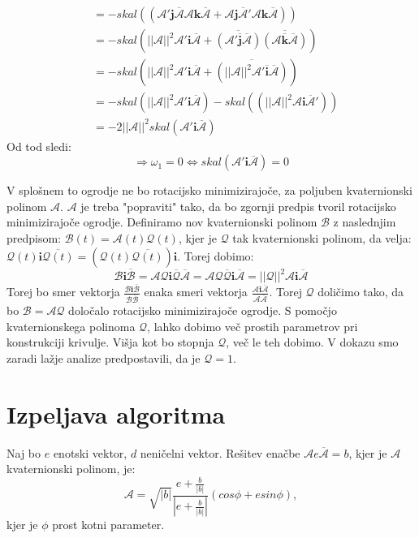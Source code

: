 \documentclass[mat1]{fmfdelo}
\newcommand{\ii}{\boldsymbol i}
\newcommand{\jj}{\boldsymbol j}
\newcommand{\kk}{\boldsymbol k}
\newcommand{\A}{\mathcal A}
\newcommand{\B}{\mathcal B}
\newcommand{\QQ}{\mathcal Q}
\begin{document}
\begin{dokaz}
\begin{equation*}
\begin{split}
	&= -skal \left( \left( \A' \jj \overline{\A} \A \kk \overline{\A}+ \A \jj \overline{\A}' \A \kk \overline{\A}  \right) \right) \\
	&= -skal \left( ||\A||^2 \A' \ii \overline{\A}+ \overline{\left(\A' \overline{\jj} \overline{\A}\right)} \overline{ \left( \A \overline{\kk} \overline{\A} \right) }\right) \\
	&= -skal \left( ||\A||^2 \A' \ii \overline{\A}+ \overline{\left( ||\A||^2 \A' \overline{\ii} \overline{\A}\right)} \right) \\
	&= -skal \left( ||\A||^2 \A' \ii \overline{\A} \right)-skal \left(\left( ||\A||^2 \A \ii \overline{\A}'\right) \right) \\
	&= -2||\A||^2 skal \left( \A' \ii \overline{\A}\right)
\end{split}
\end{equation*}
Od tod sledi:
\begin{equation*}
\Longrightarrow \omega_1 = 0 \Leftrightarrow skal \left( \A' \ii \overline{\A} \right) = 0
\end{equation*}
\end{dokaz}
\begin{opomba}
V splošnem to ogrodje ne bo rotacijsko minimizirajoče, za poljuben kvaternionski polinom $\A$. $\A$ je treba "popraviti" tako, da bo zgornji predpis tvoril rotacijsko minimizirajoče ogrodje. Definiramo nov kvaternionski polinom $\B$ z naslednjim predpisom: $\B(t) = \A(t) \QQ(t)$, kjer je $\QQ$ tak kvaternionski polinom, da velja: $\QQ(t) \ii \overline{\QQ(t)} = \left( \QQ(t) \overline{\QQ(t)} \right) \ii$. Torej dobimo:
\begin{equation*}
	\B \ii \overline{\B} = \A \QQ \ii \overline{\QQ} \overline{\A} = \A \QQ \overline{\QQ} \ii \overline{\A} = ||\QQ||^2\A\ii\overline{\A}
\end{equation*}
Torej bo smer vektorja $\frac{\B \ii \overline{\B}}{\B  \overline{\B}}$ enaka smeri vektorja $\frac{\A \ii \overline{\A}}{\A  \overline{\A}}$. Torej $\QQ$ doličimo tako, da bo $\B = \A\QQ$ določalo rotacijsko minimizirajoče ogrodje. S pomočjo kvaternionskega polinoma $\QQ$, lahko dobimo več prostih parametrov pri konstrukciji krivulje. Višja kot bo stopnja $\QQ$, več le teh dobimo. V dokazu smo zaradi lažje analize predpostavili, da je $\QQ=1$.
\end{opomba}

\section{Izpeljava algoritma}
\begin{izrek}
Naj bo $e$ enotski vektor, $d$ neničelni vektor. Rešitev enačbe $\A e \overline{\A} = b$, kjer je $\A$ kvaternionski polinom, je:
\begin{equation*}
	\A = \sqrt{|b|} \frac{e+\frac{b}{|b|}}{|e+\frac{b}{|b|}|} \left( cos \phi + e sin\phi \right),
\end{equation*}
kjer je $\phi$ prost kotni parameter.
\end{izrek}
\end{document}
